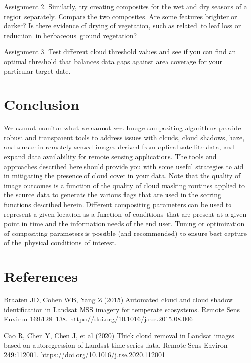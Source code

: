 \documentclass[
  letterpaper,
  DIV=11,
  numbers=noendperiod]{scrreprt}
\begin{document}
Assignment 2. Similarly, try creating composites for the wet and dry
seasons of a region separately. Compare the two composites. Are some
features brighter or darker? Is there evidence of drying of vegetation,
such as related~to leaf loss or reduction~in herbaceous~ground
vegetation?

Assignment 3. Test different cloud threshold values and see if you can
find an optimal threshold that balances data gaps against area coverage
for your particular target date.

\hypertarget{conclusion-10}{%
\section*{Conclusion}\label{conclusion-10}}


We cannot monitor what we cannot see. Image compositing algorithms
provide robust and transparent tools to address issues with clouds,
cloud shadows, haze, and smoke in remotely sensed images derived from
optical satellite data, and expand data availability for remote sensing
applications. The tools and approaches described here should provide you
with some useful strategies to aid in mitigating the presence of cloud
cover in your data. Note that the quality of image outcomes is a
function of the quality of cloud masking routines applied to the source
data to generate the various flags that are used in the scoring
functions described herein. Different compositing parameters can be used
to represent a given location as a function~of conditions~that are
present at a given point in time and the information needs of the end
user. Tuning or optimization of compositing parameters is possible (and
recommended) to ensure best capture of the~physical conditions~of
interest.

\hypertarget{references-6}{%
\section*{References}\label{references-6}}


Braaten JD, Cohen WB, Yang Z (2015) Automated cloud and cloud shadow
identification in Landsat MSS imagery for temperate ecosystems. Remote
Sens Environ 169:128--138. https://doi.org/10.1016/j.rse.2015.08.006

Cao R, Chen Y, Chen J, et al (2020) Thick cloud removal in Landsat
images based on autoregression of Landsat time-series data. Remote Sens
Environ 249:112001. https://doi.org/10.1016/j.rse.2020.112001
\end{document}
